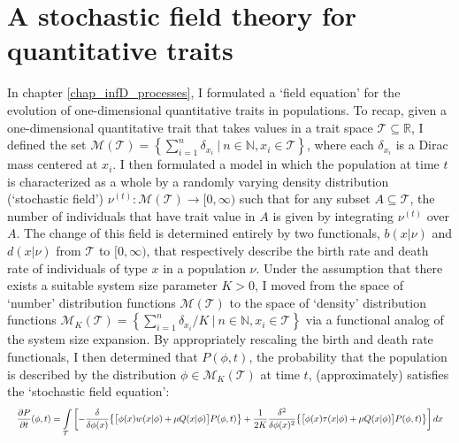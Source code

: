 \section{A stochastic field theory for quantitative traits}\label{sec_disc_field_eqns}

In chapter \ref{chap_infD_processes}, I formulated a `field equation' for the evolution of one-dimensional quantitative traits in populations. To recap, given a one-dimensional quantitative trait that takes values in a trait space $\mathcal{T} \subseteq \mathbb{R}$, I defined the set $\mathcal{M}(\mathcal{T}) =  \left\{\sum_{i=1}^{n}\delta_{x_i} \ | \ n \in \mathbb{N}, x_i \in \mathcal{T}\right\}$, where each $\delta_{x_i}$ is a Dirac mass centered at $x_i$. I then formulated a model in which the population at time $t$ is characterized as a whole by a randomly varying density distribution (`stochastic field') $\nu^{(t)}: \mathcal{M}(\mathcal{T}) \to [0,\infty)$ such that for any subset $A \subseteq \mathcal{T}$, the number of individuals that have trait value in $A$ is given by integrating $\nu^{(t)}$ over $A$. The change of this field is determined entirely by two functionals, $b(x|\nu)$ and $d(x|\nu)$ from $\mathcal{T}$ to $[0,\infty)$, that respectively describe the birth rate and death rate of individuals of type $x$ in a population $\nu$. Under the assumption that there exists a suitable system size parameter $K > 0$, I moved from the space of `number' distribution functions $\mathcal{M}(
\mathcal{T})$ to the space of `density' distribution functions $\mathcal{M}_{K}(\mathcal{T}) =  \left\{\sum_{i=1}^{n}\delta_{x_i}/K \ | \ n \in \mathbb{N}, x_i \in \mathcal{T}\right\}$ via a functional analog of the system size expansion. By appropriately rescaling the birth and death rate functionals, I then determined that $P(\phi,t)$, the probability that the population is described by the distribution $\phi \in \mathcal{M}_{K}(\mathcal{T})$ at time $t$, (approximately) satisfies the `stochastic field equation':
\begin{equation}
\label{disc_functional_field_eqns}
\resizebox{\textwidth}{!}{$\displaystyle
\frac{\partial P}{\partial t}(\phi,t) = \int\limits_{\mathcal{T}}\left[-
\frac{\delta}{\delta\phi(x)} \big{\{} \big{[}\phi(x) w(x|\phi) + \mu Q(x|\phi)\big{]} P(\phi,t) \big{\}} + \frac{1}{2K}\frac{\delta^2}{\delta\phi(x)^2}\big{\{}\big{[}\phi(x) \tau(x|\phi) + \mu Q(x|\phi)\big{]}P(\phi,t)\big{\}}\right]dx$}
\end{equation}
